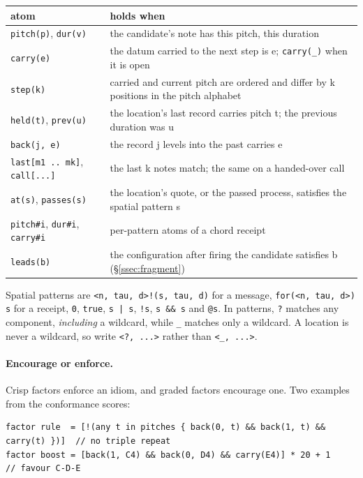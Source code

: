 \documentclass[11pt,a4paper]{article}
\newcommand{\ttx}[1]{\texttt{#1}}
\begin{document}
\begin{center}
\small
\begin{tabularx}{\linewidth}{@{}l>{\raggedright\arraybackslash}X@{}}
\toprule
atom & holds when \\
\midrule
\ttx{pitch(p)}, \ttx{dur(v)} & the candidate's note has this pitch, this
  duration \\
\ttx{carry(e)} & the datum carried to the next step is e; \ttx{carry(\_)} when
  it is open \\
\ttx{step(k)} & carried and current pitch are ordered and differ by k
  positions in the pitch alphabet \\
\ttx{held(t)}, \ttx{prev(u)} & the location's last record carries pitch t;
  the previous duration was u \\
\ttx{back(j, e)} & the record j levels into the past carries e \\
\ttx{last[m1 .. mk]}, \ttx{call[...]} & the last k notes match; the same on
  a handed-over call \\
\ttx{at(s)}, \ttx{passes(s)} & the location's quote, or the passed process,
  satisfies the spatial pattern s \\
\ttx{pitch\#i}, \ttx{dur\#i}, \ttx{carry\#i} & per-pattern atoms of a chord
  receipt \\
\ttx{leads(b)} & the configuration after firing the candidate satisfies b
  (\S\ref{ssec:fragment}) \\
\bottomrule
\end{tabularx}
\end{center}

\noindent Spatial patterns are \ttx{<n, tau, d>!(s, tau, d)} for a message,
\ttx{for(<n, tau, d>) s} for a receipt, \ttx{0}, \ttx{true}, \ttx{s | s},
\ttx{!s}, \ttx{s \&\& s} and \ttx{@s}. In patterns, \ttx{?} matches any
component, \emph{including} a wildcard, while \ttx{\_} matches only a
wildcard. A location is never a wildcard, so write \ttx{<?, ...>} rather than
\ttx{<\_, ...>}.

\paragraph{Encourage or enforce.} Crisp factors enforce an idiom, and graded
factors encourage one. Two examples from the conformance scores:
\begin{lstlisting}[language=score]
factor rule  = [!(any t in pitches { back(0, t) && back(1, t) && carry(t) })]  // no triple repeat
factor boost = [back(1, C4) && back(0, D4) && carry(E4)] * 20 + 1             // favour C-D-E
\end{lstlisting}
\end{document}
